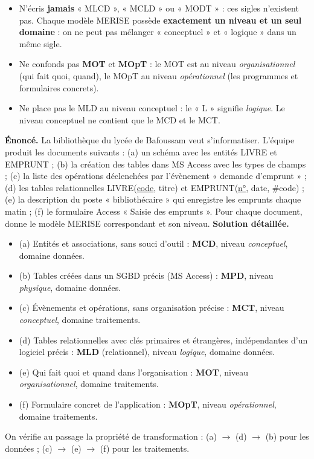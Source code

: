 \documentclass[11pt]{article}
\begin{document}
\begin{attention}
\begin{itemize}
\item N'écris \textbf{jamais} « MLCD », « MCLD » ou « MODT » : ces sigles n'existent pas. Chaque modèle MERISE possède \textbf{exactement un niveau et un seul domaine} : on ne peut pas mélanger « conceptuel » et « logique » dans un même sigle.
\item Ne confonds pas \textbf{MOT} et \textbf{MOpT} : le MOT est au niveau \emph{organisationnel} (qui fait quoi, quand), le MOpT au niveau \emph{opérationnel} (les programmes et formulaires concrets).
\item Ne place pas le MLD au niveau conceptuel : le « L » signifie \emph{logique}. Le niveau conceptuel ne contient que le MCD et le MCT.
\end{itemize}
\end{attention}

\begin{exoresolu}
\textbf{Énoncé.} La bibliothèque du lycée de Bafoussam veut s'informatiser. L'équipe produit les documents suivants : (a) un schéma avec les entités LIVRE et EMPRUNT ; (b) la création des tables dans MS Access avec les types de champs ; (c) la liste des opérations déclenchées par l'évènement « demande d'emprunt » ; (d) les tables relationnelles LIVRE(\underline{code}, titre) et EMPRUNT(\underline{n°}, date, \#code) ; (e) la description du poste « bibliothécaire » qui enregistre les emprunts chaque matin ; (f) le formulaire Access « Saisie des emprunts ». Pour chaque document, donne le modèle MERISE correspondant et son niveau.
\tcblower
\textbf{Solution détaillée.}
\begin{itemize}
\item (a) Entités et associations, sans souci d'outil : \textbf{MCD}, niveau \emph{conceptuel}, domaine données.
\item (b) Tables créées dans un SGBD précis (MS Access) : \textbf{MPD}, niveau \emph{physique}, domaine données.
\item (c) Évènements et opérations, sans organisation précise : \textbf{MCT}, niveau \emph{conceptuel}, domaine traitements.
\item (d) Tables relationnelles avec clés primaires et étrangères, indépendantes d'un logiciel précis : \textbf{MLD} (relationnel), niveau \emph{logique}, domaine données.
\item (e) Qui fait quoi et quand dans l'organisation : \textbf{MOT}, niveau \emph{organisationnel}, domaine traitements.
\item (f) Formulaire concret de l'application : \textbf{MOpT}, niveau \emph{opérationnel}, domaine traitements.
\end{itemize}
On vérifie au passage la propriété de transformation : (a) $\rightarrow$ (d) $\rightarrow$ (b) pour les données ; (c) $\rightarrow$ (e) $\rightarrow$ (f) pour les traitements.
\end{exoresolu}
\end{document}
